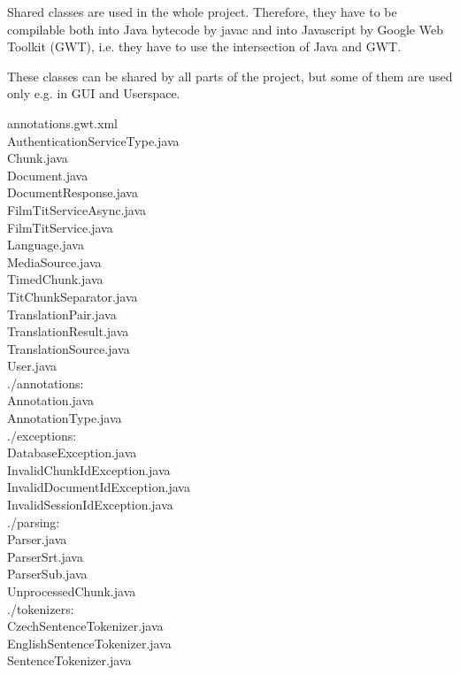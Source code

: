 
Shared classes are used in the whole project. Therefore, they have to be compilable both into Java bytecode by javac and into Javascript by Google Web Toolkit (GWT), i.e. they have to use the intersection of Java and GWT.

These classes can be shared by all parts of the project, but some of them are used only e.g. in GUI and Userspace.

annotations.gwt.xml \\
AuthenticationServiceType.java \\
Chunk.java \\
Document.java \\
DocumentResponse.java \\
FilmTitServiceAsync.java \\
FilmTitService.java \\
Language.java \\
MediaSource.java \\
TimedChunk.java \\
TitChunkSeparator.java \\
TranslationPair.java \\
TranslationResult.java \\
TranslationSource.java \\
User.java \\

./annotations: \\
Annotation.java \\
AnnotationType.java \\

./exceptions: \\
DatabaseException.java \\
InvalidChunkIdException.java \\
InvalidDocumentIdException.java \\
InvalidSessionIdException.java \\

./parsing: \\
Parser.java \\
ParserSrt.java \\
ParserSub.java \\
UnprocessedChunk.java \\

./tokenizers: \\
CzechSentenceTokenizer.java \\
EnglishSentenceTokenizer.java \\
SentenceTokenizer.java \\
